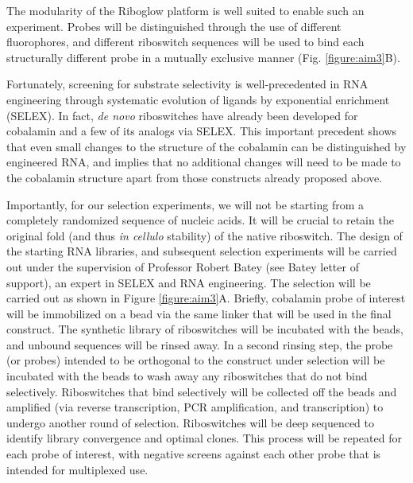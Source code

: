 The modularity of the Riboglow platform is well suited to enable such an experiment. Probes will be distinguished through the use of different fluorophores, and different riboswitch sequences will be used to bind each structurally different probe in a mutually exclusive manner (Fig. \ref{figure:aim3}B).

Fortunately, screening for substrate selectivity is well-precedented in RNA engineering through systematic evolution of ligands by exponential enrichment (SELEX)\cite{MairalAptamersmoleculartools2008,ChoApplicationsAptamersSensors2009}.
In fact, \textit{de novo} riboswitches have already been developed for cobalamin and a few of its analogs via SELEX\cite{LorschvitroselectionRNA1994}. This important precedent shows that even small changes to the structure of the cobalamin can be distinguished by engineered RNA, and implies that no additional changes will need to be made to the cobalamin structure apart from those constructs already proposed above.

Importantly, for our selection experiments, we will not be starting from a completely randomized sequence of nucleic acids. It will be crucial to retain the original fold (and thus \textit{in cellulo} stability) of the native riboswitch. The design of the starting RNA libraries, and subsequent selection experiments will be carried out under the supervision of Professor Robert Batey (see Batey letter of support), an expert in SELEX and RNA engineering\cite{TrauschChapterThreeDesign2015}.
The selection will be carried out as shown in Figure \ref{figure:aim3}A. Briefly, cobalamin probe of interest will be immobilized on a bead via the same linker that will be used in the final construct. The synthetic library of riboswitches will be incubated with the beads, and unbound sequences will be rinsed away. In a second rinsing step, the probe (or probes) intended to be orthogonal to the construct under selection will be incubated with the beads to wash away any riboswitches that do not bind selectively. 
Riboswitches that bind selectively will be collected off the beads and amplified (via reverse transcription, PCR amplification, and transcription) to undergo another round of selection. Riboswitches will be deep sequenced to identify library convergence and optimal clones. This process will be repeated for each probe of interest, with negative screens against each other probe that is intended for multiplexed use.


